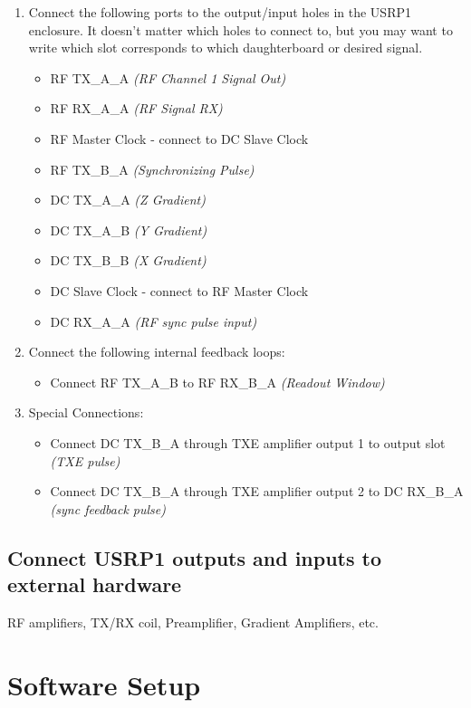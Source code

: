 \documentclass[11pt, oneside]{article}   	%
\begin{document}
\begin{enumerate}
	\item Connect the following ports to the output/input holes in the USRP1 enclosure.  It doesn't matter which holes to connect to, but you may want to write which slot corresponds to which daughterboard or desired signal.
	\begin{itemize}
		\item RF TX\_A\_A \textit{(RF Channel 1 Signal Out)}
		\item RF RX\_A\_A \textit{(RF Signal RX)}
		\item RF Master Clock - connect to DC Slave Clock
		\item RF TX\_B\_A \textit{(Synchronizing Pulse)}
		\item DC TX\_A\_A \textit{(Z Gradient)}
		\item DC TX\_A\_B \textit{(Y Gradient)}
		\item DC TX\_B\_B \textit{(X Gradient)}
		\item DC Slave Clock - connect to RF Master Clock
		\item DC RX\_A\_A \textit{(RF sync pulse input)}
	\end{itemize}
	\item Connect the following internal feedback loops:
	\begin{itemize}
		\item Connect RF TX\_A\_B to RF RX\_B\_A \textit{(Readout Window)}
	\end{itemize}
	\item Special Connections:
	\begin{itemize}
		\item Connect DC TX\_B\_A through TXE amplifier output 1 to output slot \textit{(TXE pulse)}
		\item Connect DC TX\_B\_A through TXE amplifier output 2 to DC RX\_B\_A \textit{(sync feedback pulse)}
	\end{itemize}
\end{enumerate}

\subsection{Connect USRP1 outputs and inputs to external hardware}
\indent RF amplifiers, TX/RX coil, Preamplifier, Gradient Amplifiers, etc.

\section{Software Setup}
\end{document}
